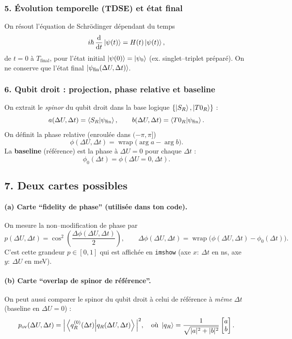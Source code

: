 \documentclass{article}
\begin{document}
\subsubsection*{5. Évolution temporelle (TDSE) et état final}
On résout l’équation de Schrödinger dépendant du temps
\[
i\hbar\,\dv{t}\ket{\psi(t)}=H(t)\ket{\psi(t)},
\]
de $t=0$ à $T_{\text{final}}$, pour l’état initial $\ket{\psi(0)}=\ket{\psi_0}$ (ex. singlet–triplet préparé).
On ne conserve que l’état final $\ket{\psi_{\text{fin}}(\Delta U,\Delta t)}$.

\subsubsection*{6. Qubit droit : projection, phase relative et baseline}
On extrait le \emph{spinor} du qubit droit dans la base logique $\{\ket{S_R},\ket{T0_R}\}$ :
\[
a(\Delta U,\Delta t)=\braket{S_R}{\psi_{\text{fin}}},\qquad
b(\Delta U,\Delta t)=\braket{T0_R}{\psi_{\text{fin}}}.
\]
On définit la phase relative (enroulée dans $(-\pi,\pi]$)
\[
\phi(\Delta U,\Delta t)=\operatorname{wrap}\!\big(\arg a-\arg b\big).
\]
La \textbf{baseline} (référence) est la phase à $\Delta U=0$ pour chaque $\Delta t$ :
\[
\phi_0(\Delta t)=\phi(\Delta U{=}0,\Delta t).
\]

\subsection*{7. Deux cartes possibles}
\paragraph{(a) Carte “fidelity de phase” (utilisée dans ton code).}
On mesure la non–modification de phase par
\[
p(\Delta U,\Delta t)=\cos^2\!\left(\frac{\Delta\phi(\Delta U,\Delta t)}{2}\right),
\qquad
\Delta\phi(\Delta U,\Delta t)=\operatorname{wrap}\!\big(\phi(\Delta U,\Delta t)-\phi_0(\Delta t)\big).
\]
C’est cette grandeur $p\in[0,1]$ qui est affichée en \texttt{imshow} (axe $x:\ \Delta t$ en ns, axe $y:\ \Delta U$ en meV).

\paragraph{(b) Carte “overlap de spinor de référence”.}
On peut aussi comparer le spinor du qubit droit à celui de référence à \emph{même} $\Delta t$ (baseline en $\Delta U=0$) :
\[
p_{\text{ov}}(\Delta U,\Delta t)
=\Big|\braket{q_R^{(0)}(\Delta t)}{q_R(\Delta U,\Delta t)}\Big|^2,
\quad
\text{où}\ \ket{q_R}=\frac{1}{\sqrt{|a|^2+|b|^2}}\begin{bmatrix}a\\ b\end{bmatrix}.
\]
\end{document}
